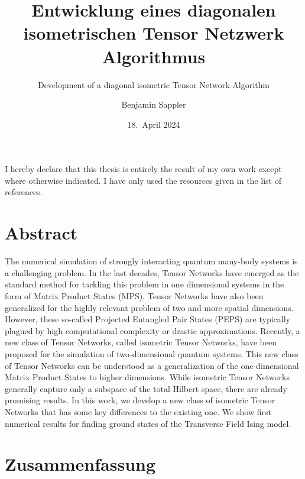 \documentclass[encoding=utf8,british]{template/thesis}
\title{Entwicklung eines diagonalen isometrischen Tensor Netzwerk Algorithmus}
\subtitle{Development of a diagonal isometric Tensor Network Algorithm}
\author{Benjamin Sappler}
\date{18.~April 2024}
\begin{document}
	\frontmatter
	\maketitle
	
	\newpage
	\thispagestyle{empty}
	
	\null\vfill
	\raggedright\noindent
	I hereby declare that this thesis is entirely the result of my own work except where otherwise indicated. I have only used the resources given in the list of references. \par
	\vspace{2cm}
	\noindent
	\par
	
	\newpage
	\thispagestyle{empty}
	
	\section*{Abstract}
	The numerical simulation of strongly interacting quantum many-body systems is a challenging problem. In the last decades, Tensor Networks have emerged as the standard method for tackling this problem in one dimensional systems in the form of Matrix Product States (MPS). Tensor Networks have also been generalized for the highly relevant problem of two and more spatial dimensions. However, these so-called Projected Entangled Pair States (PEPS) are typically plagued by high computational complexity or drastic approximations. Recently, a new class of Tensor Networks, called isometric Tensor Networks, have been proposed for the simulation of two-dimensional quantum systems. This new class of Tensor Networks can be understood as a generalization of the one-dimensional Matrix Product States to higher dimensions. While isometric Tensor Networks generally capture only a subspace of the total Hilbert space, there are already promising results. In this work, we develop a new class of isometric Tensor Networks that has some key differences to the existing one. We show first numerical results for finding ground states of the Transverse Field Ising model.
	
	\section*{Zusammenfassung}
	
	\tableofcontents
	
	\mainmatter
	
\end{document}

